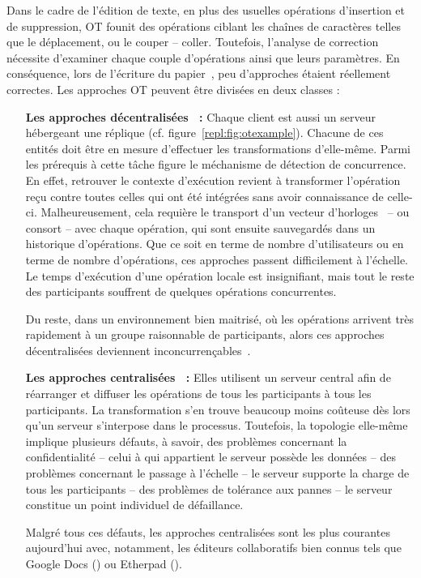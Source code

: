 Dans le cadre de l'édition de texte, en plus des usuelles opérations d'insertion
et de suppression, OT founit des opérations ciblant les chaînes de caractères
telles que le déplacement, ou le couper -- coller. Toutefois, l'analyse de
correction nécessite d'examiner chaque couple d'opérations ainsi que leurs
paramètres. En conséquence, lors de l'écriture du
papier~\cite{imine2003proving}, peu d'approches étaient réellement correctes.
Les approches OT peuvent être divisées en deux classes :
\begin{itemize}
\item [\textbf{Les approches décentralisées~\cite{sun2009contextbased} :}]
  Chaque client est aussi un serveur hébergeant une réplique
  (cf. figure~\ref{repl:fig:otexample}). Chacune de ces entités doit être en
  mesure d'effectuer les transformations d'elle-même. Parmi les prérequis à
  cette tâche figure le méchanisme de détection de concurrence. En effet,
  retrouver le contexte d'exécution revient à transformer l'opération reçu
  contre toutes celles qui ont été intégrées sans avoir connaissance de
  celle-ci. Malheureusement, cela requière le transport d'un vecteur
  d'horloges~\cite{lamport1978time} -- ou consort -- avec chaque opération, qui
  sont ensuite sauvegardés dans un historique d'opérations. Que ce soit en terme
  de nombre d'utilisateurs ou en terme de nombre d'opérations, ces approches
  passent difficilement à l'échelle. Le temps d'exécution d'une opération locale
  est insignifiant, mais tout le reste des participants souffrent de quelques
  opérations concurrentes.

  Du reste, dans un environnement bien maitrisé, où les opérations arrivent très
  rapidement à un groupe raisonnable de participants, alors ces approches
  décentralisées deviennent inconcurrençables~\cite{mehdi2014merging}.
\item [\textbf{Les approches centralisées~\cite{nichols1995high} :}] Elles
  utilisent un serveur central afin de réarranger et diffuser les opérations de
  tous les participants à tous les participants. La transformation s'en trouve
  beaucoup moins coûteuse dès lors qu'un serveur s'interpose dans le
  processus. Toutefois, la topologie elle-même implique plusieurs défauts, à
  savoir, des problèmes concernant la confidentialité -- celui à qui appartient
  le serveur possède les données -- des problèmes concernant le passage à
  l'échelle -- le serveur supporte la charge de tous les participants -- des
  problèmes de tolérance aux pannes -- le serveur constitue un point individuel
  de défaillance.

  Malgré tous ces défauts, les approches centralisées sont les plus courantes
  aujourd'hui avec, notamment, les éditeurs collaboratifs bien connus tels que
  Google Docs (\REF) ou Etherpad (\REF).
\end{itemize}


